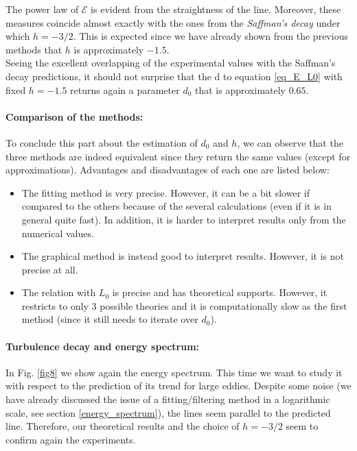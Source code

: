 \documentclass[11pt,titlepage]{article}
\begin{document}
The power law of $\mathcal{E}$ is evident from the straightness of the line. Moreover, these measures coincide almost exactly with the ones from the \emph{Saffman's decay} under which $h=-3/2$. This is expected since we have already shown from the previous methods that $h$ is approximately $-1.5$. \\
Seeing the excellent overlapping of the experimental values with the Saffman's decay predictions, it should not surprise that the d  to equation \ref{eq_E_L0} with fixed $h=-1.5$ returns again a parameter $d_0$ that is approximately $0.65$. 

\paragraph{Comparison of the methods:}
To conclude this part about the estimation of $d_0$ and $h$, we can observe that the three methods are indeed equivalent since they return the same values (except for approximations). Advantages and disadvantages of each one are listed below:
\begin{itemize}
	\item The fitting method is very precise. However, it can be a bit slower if compared to the others because of the several calculations (even if it is in general quite fast). In addition, it is harder to interpret results only from the numerical values.
	\item The graphical method is instead good to interpret results. However, it is not precise at all. 
	\item The relation with $L_0$ is precise and has theoretical supports. However, it restricts to only 3 possible theories and it is computationally slow as the first method (since it still needs to iterate over $d_0$).
\end{itemize}

\paragraph{Turbulence decay and energy spectrum: } 
 In Fig. \ref{fig8} we show again the energy spectrum. This time we want to study it with respect to the prediction of its trend for large eddies. Despite some noise (we have already discussed the issue of a fitting/filtering method in a logarithmic scale, see section \ref{energy_spectrum}), the lines seem parallel to the predicted line. Therefore, our theoretical results and the choice of $h=-3/2$ seem to confirm again the experiments.
 
\end{document}
